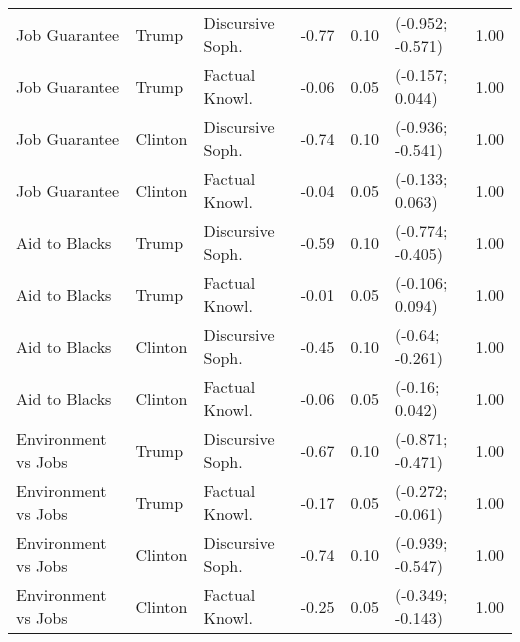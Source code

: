 \begin{table}[ht]
\begin{tabular}{lllrrlr}
  Job Guarantee & Trump & Discursive Soph. & -0.77 & 0.10 & (-0.952; -0.571) & 1.00 \\ 
  Job Guarantee & Trump & Factual Knowl. & -0.06 & 0.05 & (-0.157; 0.044) & 1.00 \\ 
  Job Guarantee & Clinton & Discursive Soph. & -0.74 & 0.10 & (-0.936; -0.541) & 1.00 \\ 
  Job Guarantee & Clinton & Factual Knowl. & -0.04 & 0.05 & (-0.133; 0.063) & 1.00 \\ 
  Aid to Blacks & Trump & Discursive Soph. & -0.59 & 0.10 & (-0.774; -0.405) & 1.00 \\ 
  Aid to Blacks & Trump & Factual Knowl. & -0.01 & 0.05 & (-0.106; 0.094) & 1.00 \\ 
  Aid to Blacks & Clinton & Discursive Soph. & -0.45 & 0.10 & (-0.64; -0.261) & 1.00 \\ 
  Aid to Blacks & Clinton & Factual Knowl. & -0.06 & 0.05 & (-0.16; 0.042) & 1.00 \\ 
  Environment vs Jobs & Trump & Discursive Soph. & -0.67 & 0.10 & (-0.871; -0.471) & 1.00 \\ 
  Environment vs Jobs & Trump & Factual Knowl. & -0.17 & 0.05 & (-0.272; -0.061) & 1.00 \\ 
  Environment vs Jobs & Clinton & Discursive Soph. & -0.74 & 0.10 & (-0.939; -0.547) & 1.00 \\ 
  Environment vs Jobs & Clinton & Factual Knowl. & -0.25 & 0.05 & (-0.349; -0.143) & 1.00 \\ 
   \hline
\end{tabular}
\end{table}
